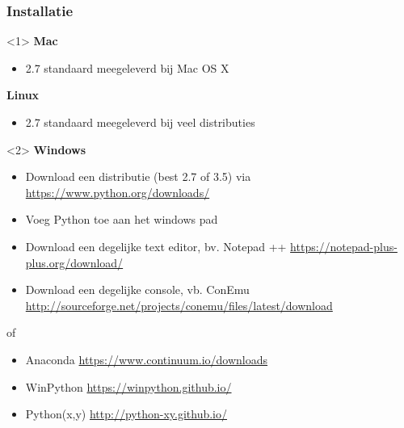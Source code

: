 \documentclass[t]{beamer}
\begin{document}
\begin{frame}
	\frametitle{Installatie}
		
	\begin{onlyenv}
		\textbf{Mac}
		\begin{itemize}
			\item 2.7 standaard meegeleverd bij Mac OS X
		\end{itemize}
		
		\textbf{Linux}
		\begin{itemize}
			\item 2.7 standaard meegeleverd bij veel distributies
		\end{itemize}
		
	\end{onlyenv}
	\begin{onlyenv}
		\textbf{Windows}
		\begin{itemize}
			\item Download een distributie (best 2.7 of 3.5) via \url{https://www.python.org/downloads/}
			\item Voeg Python toe aan het windows pad
			\item Download een degelijke text editor, bv. Notepad ++ \url{https://notepad-plus-plus.org/download/}
			\item Download een degelijke console, vb. ConEmu \url{http://sourceforge.net/projects/conemu/files/latest/download}
		\end{itemize}
		of
		\begin{itemize}
			\item Anaconda \url{https://www.continuum.io/downloads}
			\item WinPython \url{https://winpython.github.io/}
			\item Python(x,y) \url{http://python-xy.github.io/}
		\end{itemize}
	\end{onlyenv}
\end{frame}
\end{document}
